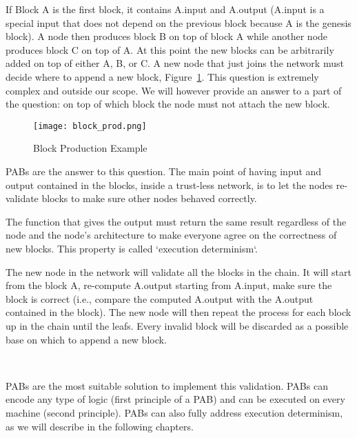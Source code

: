 If Block A is the first block, it contains A.input and A.output (A.input is a special input that does not depend on the previous block because A is the genesis block). A node then produces block B on top of block A while another node produces block C on top of A. At this point the new blocks can be arbitrarily added on top of either A, B, or C. A new node that just joins the network must decide where to append a new block, Figure~\ref{fig:block_prod}.  This question is extremely complex and outside our scope. We will however provide an answer to a part of the question: on top of which block the node must not attach the new block.

\begin{figure}[h]
  \centering
  \texttt{[image: block\_prod.png]}
  \caption{Block Production Example}
  \label{fig:block_prod}
\end{figure}

PABs are the answer to this question. The main point of having input and output contained in the blocks, inside a trust-less network, is to let the nodes re-validate blocks to make sure other nodes behaved correctly.

The function that gives the output must return the same result regardless of the node and the node's architecture to make everyone agree on the correctness of new blocks. This property is  called `execution determinism`.

The new node in the network will validate all the blocks in the chain. It will start from the block A,  re-compute A.output starting from A.input, make sure the block is correct (i.e., compare the computed A.output with the A.output contained in the block). The new node will then repeat the process for each block up in the chain until the leafs. Every invalid block will be discarded as a possible base on which to append a new block.

\

PABs are the most suitable solution to implement this validation. PABs can encode any type of logic (first principle of a PAB) and can be executed on every machine (second principle). PABs can also fully address execution determinism, as we will describe in the following chapters.
